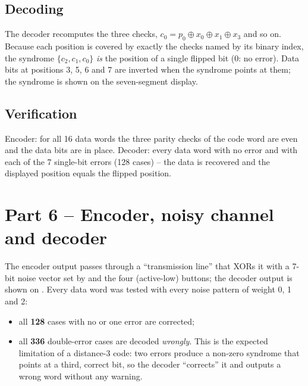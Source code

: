 \subsection{Decoding}
The decoder recomputes the three checks, $c_0=p_0\oplus x_0\oplus x_1\oplus x_3$ and so on. Because each
position is covered by exactly the checks named by its binary index, the syndrome $\{c_2,c_1,c_0\}$
\emph{is} the position of a single flipped bit (0: no error). Data bits at positions 3, 5, 6 and 7 are
inverted when the syndrome points at them; the syndrome is shown on the seven-segment display.

\subsection{Verification}
Encoder: for all 16 data words the three parity checks of the code word are even and the data bits are
in place. Decoder: every data word with no error and with each of the 7 single-bit errors
(128 cases) -- the data is recovered and the displayed position equals the flipped position.

\section{Part 6 -- Encoder, noisy channel and decoder}
The encoder output passes through a ``transmission line'' that XORs it with a 7-bit noise vector set by
 and the four (active-low) buttons; the decoder output is shown on .
Every data word was tested with every noise pattern of weight 0, 1 and 2:
\begin{itemize}
  \item all \textbf{128} cases with no or one error are corrected;
  \item all \textbf{336} double-error cases are decoded \emph{wrongly}. This is the expected limitation of a
        distance-3 code: two errors produce a non-zero syndrome that points at a third, correct bit, so the
        decoder ``corrects'' it and outputs a wrong word without any warning.
\end{itemize}

